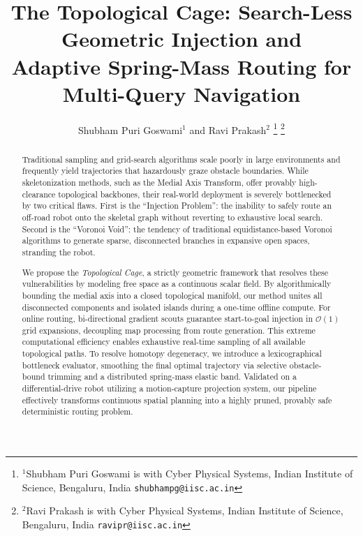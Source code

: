 \documentclass[letterpaper, 10 pt, conference]{IEEEtran}
\begin{document}
\title{\LARGE \bf
The Topological Cage: Search-Less Geometric Injection and \\ Adaptive Spring-Mass Routing for Multi-Query Navigation
}

\author{Shubham Puri Goswami$^{1}$ and Ravi Prakash$^{2}$%
\thanks{$^{1}$Shubham Puri Goswami is with Cyber Physical Systems, Indian Institute of Science, Bengaluru, India {\tt\small shubhampg@iisc.ac.in}}%
\thanks{$^{2}$Ravi Prakash is with Cyber Physical Systems, Indian Institute of Science, Bengaluru, India {\tt\small ravipr@iisc.ac.in}}%
}

\maketitle
\thispagestyle{empty}
\pagestyle{empty}

\begin{abstract}
Traditional sampling and grid-search algorithms scale poorly in large environments and frequently yield trajectories that hazardously graze obstacle boundaries. While skeletonization methods, such as the Medial Axis Transform, offer provably high-clearance topological backbones, their real-world deployment is severely bottlenecked by two critical flaws. First is the ``Injection Problem'': the inability to safely route an off-road robot onto the skeletal graph without reverting to exhaustive local search. Second is the ``Voronoi Void'': the tendency of traditional equidistance-based Voronoi algorithms to generate sparse, disconnected branches in expansive open spaces, stranding the robot. 

We propose the \textit{Topological Cage}, a strictly geometric framework that resolves these vulnerabilities by modeling free space as a continuous scalar field. By algorithmically bounding the medial axis into a closed topological manifold, our method unites all disconnected components and isolated islands during a one-time offline compute. For online routing, bi-directional gradient scouts guarantee start-to-goal injection in $\mathcal{O}(1)$ grid expansions, decoupling map processing from route generation. This extreme computational efficiency enables exhaustive real-time sampling of all available topological paths. To resolve homotopy degeneracy, we introduce a lexicographical bottleneck evaluator, smoothing the final optimal trajectory via selective obstacle-bound trimming and a distributed spring-mass elastic band. Validated on a differential-drive robot utilizing a motion-capture projection system, our pipeline effectively transforms continuous spatial planning into a highly pruned, provably safe deterministic routing problem.
\end{abstract}
\end{document}
